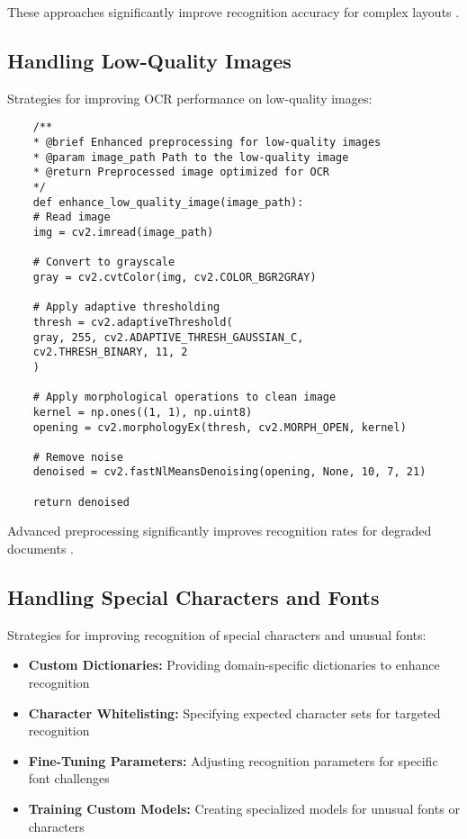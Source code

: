 These approaches significantly improve recognition accuracy for complex layouts \cite{GeekyAnts:2023}.

\subsection{Handling Low-Quality Images}
\label{subsec:low_quality}

Strategies for improving OCR performance on low-quality images:

\begin{verbatim}
	/**
	* @brief Enhanced preprocessing for low-quality images
	* @param image_path Path to the low-quality image
	* @return Preprocessed image optimized for OCR
	*/
	def enhance_low_quality_image(image_path):
	# Read image
	img = cv2.imread(image_path)
	
	# Convert to grayscale
	gray = cv2.cvtColor(img, cv2.COLOR_BGR2GRAY)
	
	# Apply adaptive thresholding
	thresh = cv2.adaptiveThreshold(
	gray, 255, cv2.ADAPTIVE_THRESH_GAUSSIAN_C, 
	cv2.THRESH_BINARY, 11, 2
	)
	
	# Apply morphological operations to clean image
	kernel = np.ones((1, 1), np.uint8)
	opening = cv2.morphologyEx(thresh, cv2.MORPH_OPEN, kernel)
	
	# Remove noise
	denoised = cv2.fastNlMeansDenoising(opening, None, 10, 7, 21)
	
	return denoised
\end{verbatim}

Advanced preprocessing significantly improves recognition rates for degraded documents \cite{DataCamp:2024}.

\subsection{Handling Special Characters and Fonts}
\label{subsec:special_chars}

Strategies for improving recognition of special characters and unusual fonts:

\begin{itemize}
	\item \textbf{Custom Dictionaries:} Providing domain-specific dictionaries to enhance recognition
	\item \textbf{Character Whitelisting:} Specifying expected character sets for targeted recognition
	\item \textbf{Fine-Tuning Parameters:} Adjusting recognition parameters for specific font challenges
	\item \textbf{Training Custom Models:} Creating specialized models for unusual fonts or characters
\end{itemize}

